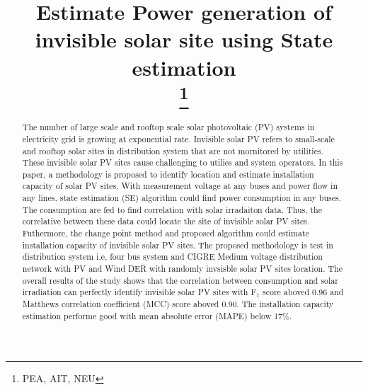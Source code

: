 \documentclass[conference]{IEEEtran}
\begin{document}
\title{Estimate Power generation of invisible solar site using State estimation\\
\thanks{PEA, AIT, NEU}
}

\author{
\and
{}
\and
{}
\and
{}
}

\maketitle

\begin{abstract}
The number of large scale and rooftop scale solar photovoltaic (PV) systems in electricity grid is growing at exponential rate.
Invisible solar PV refers to small-scale and rooftop solar sites in distribution system that are not mornitored by utilities.
These invisible solar PV sites cause challenging to utilies and system operators.
In this paper, a methodology is proposed to identify location and estimate installation capacity of solar PV sites.
With measurement voltage at any buses and power flow in any lines, state estimation (SE) algorithm could find power consumption in any buses.
The consumption are fed to find correlation with solar irradaiton data.
Thus, the correlative between these data could locate the site of invisible solar PV sites.
Futhermore, the change point method and proposed algorithm could estimate installation capacity of invisible solar PV sites.
The proposed methodology is test in distribution system i.e, four bus system and CIGRE Medium voltage distribution network with PV and Wind DER with randomly invsisble solar PV sites location.
The overall results of the study shows that the correlation between consumption and solar irradiation can perfectly identify invisible solar PV sites with $\text{F}_{1}$ score aboved 0.96 and Matthews correlation coefficient (MCC) score aboved 0.90.
The installation capacity estimation performe good with mean absolute error (MAPE) below 17\%.
\end{abstract}
\end{document}
